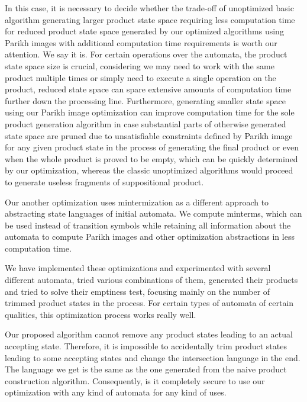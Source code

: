 In this case, it is necessary to decide whether the trade-off of unoptimized basic algorithm generating larger product state space requiring less computation time for reduced product state space generated by our optimized algorithms using Parikh images with additional computation time requirements is worth our attention. We say it is. For certain operations over the automata, the product state space size is crucial, considering we may need to work with the same product multiple times or simply need to execute a single operation on the product, reduced state space can spare extensive amounts of computation time further down the processing line. Furthermore, generating smaller state space using our Parikh image optimization can improve computation time for the sole product generation algorithm in case substantial parts of otherwise generated state space are pruned due to unsatisfiable constraints defined by Parikh image for any given product state in the process of generating the final product or even when the whole product is proved to be empty, which can be quickly determined by our optimization, whereas the classic unoptimized algorithms would proceed to generate useless fragments of suppositional product.


Our another optimization uses mintermization as a different approach to abstracting state languages of initial automata. We compute minterms, which can be used instead of transition symbols while retaining all information about the automata to compute Parikh images and other optimization abstractions in less computation time.


We have implemented these optimizations and experimented with several different automata, tried various combinations of them, generated their products and tried to solve their emptiness test, focusing mainly on the number of trimmed product states in the process. For certain types of automata of certain qualities, this optimization process works really well.

Our proposed algorithm cannot remove any product states leading to an actual accepting state. Therefore, it is impossible to accidentally trim product states leading to some accepting states and change the intersection language in the end. The language we get is the same as the one generated from the naive product construction algorithm. Consequently, is it completely secure to use our optimization with any kind of automata for any kind of uses.

